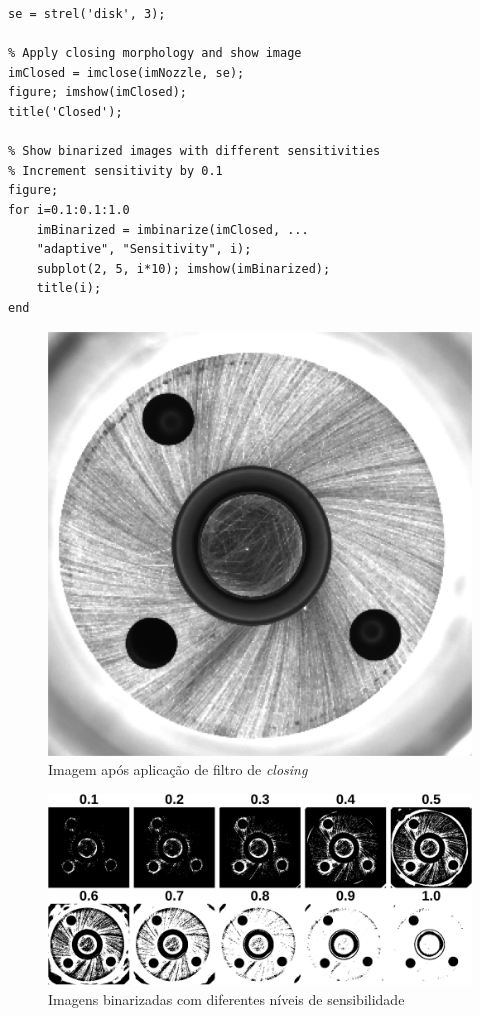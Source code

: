 \documentclass[conference]{IEEEtran}
\begin{document}
\begin{lstlisting}[caption={Filtragem e análise da sensibilidade para binarização}, label={lst:codigo-filtering}]
% Create structuring element
se = strel('disk', 3);

% Apply closing morphology and show image
imClosed = imclose(imNozzle, se);
figure; imshow(imClosed);
title('Closed');

% Show binarized images with different sensitivities
% Increment sensitivity by 0.1
figure;
for i=0.1:0.1:1.0
	imBinarized = imbinarize(imClosed, ...
	"adaptive", "Sensitivity", i); 
	subplot(2, 5, i*10); imshow(imBinarized);
	title(i);
end
\end{lstlisting}

\begin{figure}[h]
	\centering
	\includegraphics[scale=0.21]{Images/Image0000_closed.png}
	\caption{Imagem após aplicação de filtro de \textit{closing}}
	\label{fig:imClosed}
\end{figure}

\begin{figure}[h]
	\centering
	\includegraphics[scale=0.70]{Images/Image0000_sensitivity.png}
	\caption{Imagens binarizadas com diferentes níveis de sensibilidade}
	\label{fig:sensivities}
\end{figure}
\end{document}
